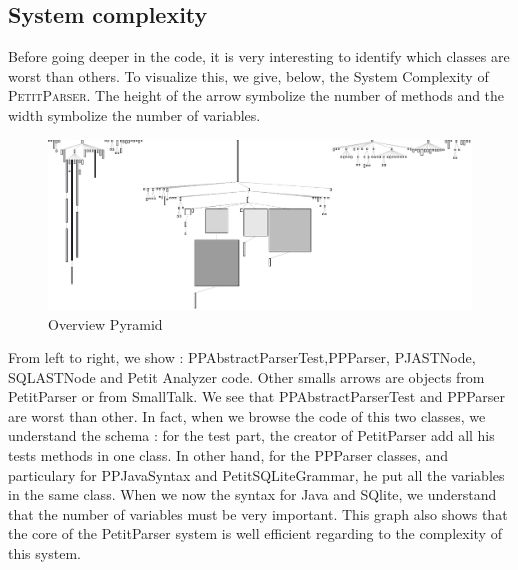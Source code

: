 \subsection{System complexity}
Before going deeper in the code, it is very interesting to identify which classes are worst than others.  To visualize this, we give, below, the System Complexity of \textsc{PetitParser}.
The height of the arrow symbolize the number of methods and the width symbolize the number of variables.
\begin{figure}[ht]
\label{pyramid}
\includegraphics[scale=0.8]{system_complexity.png}
\caption{Overview Pyramid}
\end{figure}
From left to right, we show : PPAbstractParserTest,PPParser, PJASTNode, SQLASTNode and Petit Analyzer code.  Other smalls arrows are objects from PetitParser or from SmallTalk.
We see that PPAbstractParserTest and PPParser are worst than other.  In fact, when we browse the code of this two classes, we understand the schema : for the test part, the creator of PetitParser add all his tests methods in one class.  In other hand, for the PPParser classes, and particulary for PPJavaSyntax and PetitSQLiteGrammar, he put all the variables in the same class.  When we now the syntax for Java and SQlite, we understand that the number of variables must be very important.
This graph also shows that the core of the PetitParser system is well efficient regarding to the complexity of this system.






